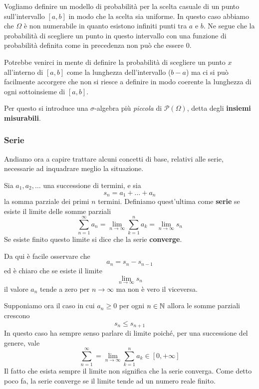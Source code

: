 \begin{example}
	Vogliamo definire un modello di probabilità per la scelta casuale di un punto sull'intervallo
	$[a,b]$ in modo che la scelta sia uniforme. In questo caso abbiamo che $\Omega$ è non
	numerabile in quanto esistono infiniti punti tra $a$ e $b$. Ne segue che la probabilità di
	scegliere un punto in questo intervallo con una funzione di probabilità definita come in
	precedenza non può che essere 0.

	Potrebbe venirci in mente di definire la probabilità di scegliere un punto $x$ all'interno di
	$[a,b]$ come la lunghezza dell'intervallo ($b-a$) ma ci si può facilmente accorgere che non
	si riesce a definire in modo coerente la lunghezza di ogni sottoinsieme di $[a,b]$.

	Per questo si introduce una $\sigma$-algebra più \emph{piccola} di $\mathcal{P}(\Omega)$,
	detta degli \textbf{insiemi misurabili}.
\end{example}

\subsubsection{Serie}
Andiamo ora a capire trattare alcuni concetti di base, relativi alle serie, necessarie ad
inquadrare meglio la situazione.

\begin{definition}
	Sia $a_1, a_2, \dots$ una successione di termini, e sia
	\[ s_n = a_1 + \dots + a_n \]
	la somma parziale dei primi $n$ termini. Definiamo quest'ultima come \textbf{serie} se esiste
	il limite delle somme parziali
	\[ \sum_{n=1}^\infty a_n = \lim_{n \to \infty} \sum_{k=1}^n a_k = \lim_{n \to \infty} s_n \]
	Se esiste finito questo limite si dice che la serie \textbf{converge}.
\end{definition}

\begin{observation}
	Da qui è facile osservare che
	\[ a_n = s_n - s_{n-1} \]
	ed è chiaro che se esiste il limite
	\[ \lim_{n \to \infty} s_n \]
	il valore $a_n$ tende a zero per $n \to \infty$ ma non è vero il viceversa.
\end{observation}

Supponiamo ora il caso in cui $a_n \geq 0$ per ogni $n \in \mathbb{N}$ allora le somme parziali crescono
\[ s_n \leq s_{n+1} \]
In questo caso ha sempre senso parlare di limite poiché, per una successione del genere, vale
\[ \sum_{n=1}^\infty = \lim_{n \to \infty} \sum_{k=1}^n a_k \in [0, +\infty]  \]
Il fatto che esista sempre il limite non significa che la serie converga. Come detto poco fa, la
serie converge se il limite tende ad un numero reale finito.

